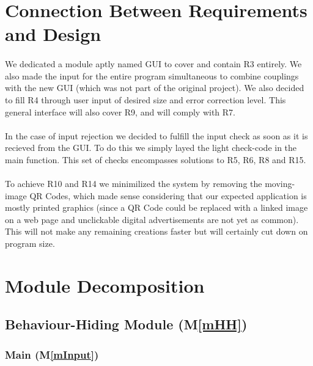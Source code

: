 \documentclass[12pt, titlepage]{article}
\newcommand{\mref}[1]{M\ref{#1}}
\begin{document}
\section{Connection Between Requirements and Design} \label{SecConnection}

\paragraph{}
We dedicated a module aptly named GUI to cover and contain R3 entirely. 
We also made the input for the entire program simultaneous to combine couplings
with the new GUI (which was not part of the original project). We also 
decided to fill R4 through user input of desired size and error correction level.
This general interface will also cover R9, and will comply with R7.

\paragraph{}
In the case of input rejection we decided to fulfill the input check as soon as it is 
recieved from the GUI. To do this we simply layed the light check-code in the main function.
This set of checks encompasses solutions to R5, R6, R8 and R15.

\paragraph{}
To achieve R10 and R14 we minimilized the system by removing the moving-image QR 
Codes, which made sense considering that our expected application is mostly printed 
graphics (since a QR Code could be replaced with a linked image on a web page and 
unclickable digital advertisements are not yet as common). This will not make any 
remaining creations faster but will certainly cut down on program size.

\section{Module Decomposition} \label{SecMD}


\subsection{Behaviour-Hiding Module (\mref{mHH})}

\subsubsection{Main (\mref{mInput})}
\end{document}
